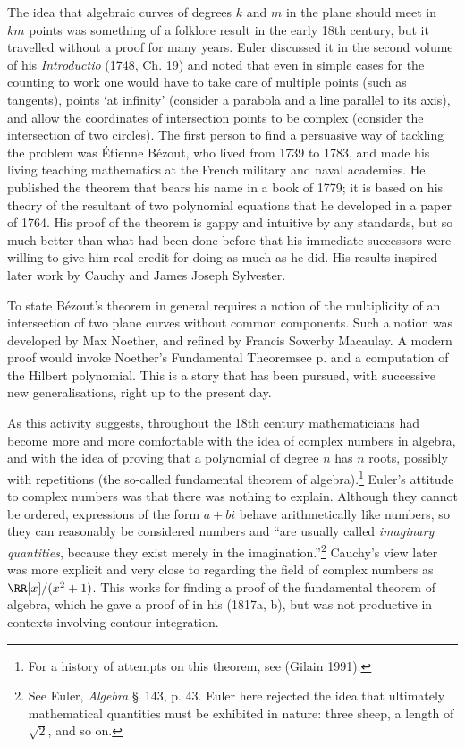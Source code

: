 The idea that algebraic curves of degrees $k$ and $m$ in the plane should meet in $km$ points was something of a folklore result in the early 18th century, but it travelled without a proof for many years. Euler discussed it in the second volume of his  \emph{Introductio} (1748, Ch. 19) and noted that even in simple cases  for the counting to work one would have to take care of multiple points (such as tangents),  points `at infinity' (consider a parabola and a line parallel to its axis), and allow the  coordinates of intersection points to be complex (consider the intersection of two circles). The first person to find a persuasive way of tackling the problem was \'Etienne B\'ezout, who lived from 1739 to 1783, and made his living teaching mathematics at the French military and naval academies. He published the theorem that bears his name in a book of 1779; it is based on his theory of the resultant of two polynomial equations that he developed in a paper of 1764. His proof of the theorem is gappy and intuitive by any standards, but so much better than what had been done before that his immediate successors were willing to give him real credit for doing as much as he did. His results inspired later work by Cauchy and James Joseph Sylvester.

To state  B\'ezout's theorem in general requires a notion of the multiplicity of an intersection of two plane curves without common components. Such a notion was developed by Max Noether, and refined by Francis Sowerby Macaulay. A modern proof would invoke Noether's Fundamental Theorem\emdash see p. \pageref{Noether'sFT}\emdash and a computation of the Hilbert polynomial. This is a story that  has been pursued, with successive new generalisations, right up to the present day. 


As this activity suggests, throughout the 18th century mathematicians had become more and more comfortable with the idea of complex numbers in algebra, and with the idea of proving that a polynomial of degree $n$ has $n$ roots, possibly with repetitions (the so-called fundamental theorem of algebra).\footnote{For a history of attempts on this theorem, see (Gilain 1991).} Euler's attitude to complex numbers was that there was nothing to explain. Although they cannot be ordered, expressions of the form $a+bi$  behave arithmetically like numbers, so they can reasonably be considered numbers  and ``are usually called \emph{imaginary quantities}, because they exist merely in the imagination.''\footnote{See Euler, \emph{Algebra} \S\, 143, p. 43. Euler here rejected the idea that ultimately mathematical quantities must be exhibited in nature: three sheep, a length of $\sqrt{2}$, and so on.} Cauchy's view later was more explicit and very close to regarding  the field of complex numbers as $\RR [x]/(x^2 + 1)$. This works for finding a proof of the fundamental theorem of algebra, which he gave a proof of in his (1817a, b), but was not productive in contexts involving contour integration. 

